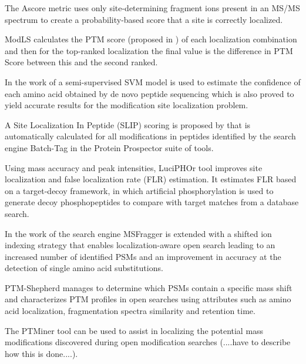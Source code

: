 \documentclass{bioinfo}
\begin{document}
The Ascore \citep{AScore} metric uses only site-determining fragment ions present in an MS/MS spectrum to create a probability-based score that a site is correctly localized.

ModLS \citep{ModLS} calculates the PTM score (proposed in \citep{PTMScore}) of each localization combination and then for the top-ranked localization the final value is the difference in PTM Score between this and the second ranked.

In the work of \citep{pSite} a semi-supervised SVM model is used to estimate the confidence of each amino acid obtained by de novo peptide sequencing which is also proved to yield accurate results for the modification site localization problem.

A Site Localization In Peptide (SLIP) scoring is proposed by \citep{SLIP} that is automatically calculated for all modifications in peptides identified by the search engine Batch-Tag in the Protein Prospector suite of tools.

Using mass accuracy and peak intensities, LuciPHOr tool \citep{LuciPHOr} improves site localization and false localization rate (FLR) estimation. It estimates FLR based on a target-decoy framework, in which artificial phosphorylation is used to generate decoy phosphopeptides to compare with target matches from a database search.

In the work of \citep{MSFragger} the search engine MSFragger is extended with a shifted ion indexing strategy that enables localization-aware open search leading to an increased number of identified PSMs and an improvement in accuracy at the detection of single amino acid substitutions.

PTM-Shepherd \citep{PTM-Shepherd} manages to determine which PSMs contain a specific mass shift and characterizes PTM profiles in open searches using attributes such as amino acid localization, fragmentation spectra similarity and retention time.

The PTMiner \citep{PTMiner} tool can be used to assist in localizing the potential mass modifications discovered during open modification searches (....have to describe how this is done....).




\end{document}
